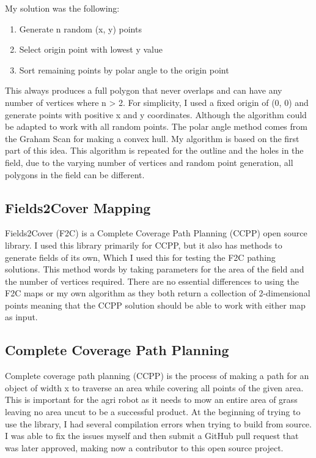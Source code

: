 \documentclass[progress]{cmpreport}
\begin{document}
My solution was the following:
\begin{enumerate}
	\item{Generate n random (x, y) points}
	\item{Select origin point with lowest y value}
	\item{Sort remaining points by polar angle to the origin point}
\end{enumerate}
This always produces a full polygon that never overlaps and can have any number of vertices where n > 2.
For simplicity, I used a fixed origin of (0, 0) and generate points with positive x and y coordinates. Although the algorithm could be adapted to work with all random points.
The polar angle method comes from the Graham Scan for making a convex hull. My algorithm is based on the first part of this idea.
This algorithm is repeated for the outline and the holes in the field, due to the varying number of vertices and random point generation, all polygons in the field can be different.

\subsection{Fields2Cover Mapping}
Fields2Cover (F2C) is a Complete Coverage Path Planning (CCPP) open source library. I used this library primarily for CCPP, but it also has methods to generate fields of its own,
Which I used this for testing the F2C pathing solutions.
This method words by taking parameters for the area of the field and the number of vertices required.
There are no essential differences to using the F2C maps or my own algorithm as they both return a collection of 2-dimensional points meaning that the CCPP solution should be able to work with either map as input.

\subsection{Complete Coverage Path Planning}
Complete coverage path planning (CCPP) is the process of making a path for an object of width x to traverse an area while covering all points of the given area.
This is important for the agri robot as it needs to mow an entire area of grass leaving no area uncut to be a successful product.
At the beginning of trying to use the library, I had several compilation errors when trying to build from source.
I was able to fix the issues myself and then submit a GitHub pull request that was later approved, making now a contributor to this open source project.
\end{document}
